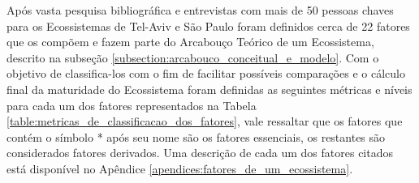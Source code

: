 Após vasta pesquisa bibliográfica e entrevistas com mais de 50 pessoas chaves para os Ecossistemas de Tel-Aviv e São Paulo foram definidos cerca de 22 fatores que os compõem e fazem parte do Arcabouço Teórico de um Ecossistema, descrito na subseção \ref{subsection:arcabouco_conceitual_e_modelo}. Com o objetivo de classifica-los com o fim de facilitar possíveis comparações e o cálculo final da maturidade do Ecossistema foram definidas as seguintes métricas e níveis para cada um dos fatores representados na Tabela \ref{table:metricas_de_classificacao_dos_fatores}, vale ressaltar que os fatores que contém o símbolo * após seu nome são os fatores essenciais, os restantes são considerados fatores derivados. Uma descrição de cada um dos fatores citados está disponível no Apêndice \ref{apendices:fatores_de_um_ecossistema}.

